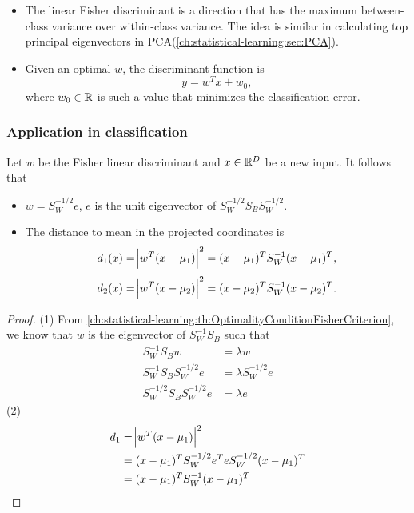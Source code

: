 \begin{refsection}
\begin{remark}[interpretation]\hfill
	\begin{itemize}
		\item The linear Fisher discriminant is a direction that has the maximum between-class variance over within-class variance. The idea is similar in calculating top principal eigenvectors in PCA(\autoref{ch:statistical-learning:sec:PCA}).
		\item Given an optimal $w$, the discriminant function is $$y = w^Tx + w_0,$$
		where $w_0\in\mathbb{R}$ is such a value that minimizes the classification error.
	\end{itemize}
\end{remark}




\subsubsection{Application in classification}

\begin{lemma}
	Let $w$ be the Fisher linear discriminant and $x\in\mathbb{R}^D$ be a new input.	It follows that
	\begin{itemize}
		\item 	$w = S_W^{-1/2}e$, $e$ is the unit eigenvector of $S_W^{-1/2}S_BS_W^{-1/2}$.
		\item  The distance to mean in the projected coordinates is
		$$d_1(x) = \abs{w^T(x - \mu_1)}^2 = (x-\mu_1)^TS_W^{-1}(x-\mu_1)^T,$$
		$$d_2(x) = \abs{w^T(x - \mu_2)}^2 = (x-\mu_2)^TS_W^{-1}(x-\mu_2)^T.$$
	\end{itemize}	
\end{lemma}
\begin{proof}
	(1)	From \autoref{ch:statistical-learning:th:OptimalityConditionFisherCriterion}, we know that $w$ is the eigenvector of $S_W^{-1}S_B$ such that
	\begin{align*}
	S_W^{-1}S_B w &= \lambda w \\
	S_W^{-1}S_B S_W^{-1/2}e &= \lambda S_W^{-1/2}e \\
	S_W^{-1/2}S_B S_W^{-1/2}e &= \lambda e 
	\end{align*}
	(2) 
	\begin{align*}
	d_1 &= \abs{w^T(x - \mu_1)}^2 \\
	&= (x-\mu_1)^TS_W^{-1/2}e^TeS_W^{-1/2}(x-\mu_1)^T \\
	&= (x-\mu_1)^TS_W^{-1}(x-\mu_1)^T 
	\end{align*}
\end{proof}




\end{refsection}
